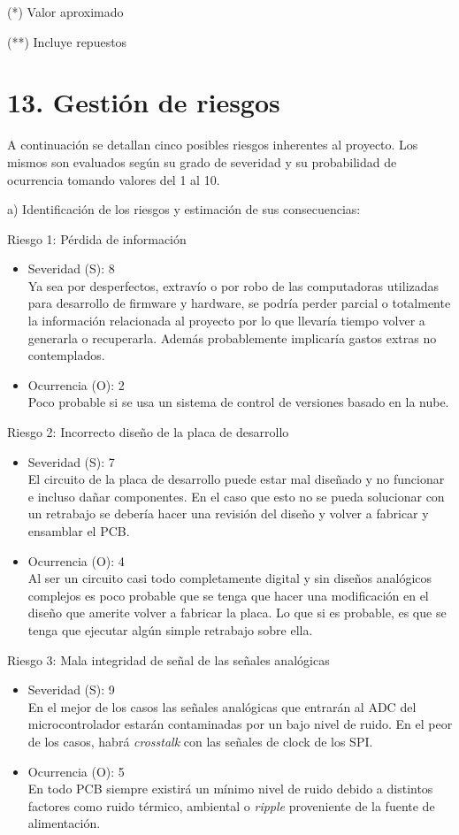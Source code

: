 \documentclass[
11pt, %
]{charter}
\begin{document}
(*) Valor aproximado

(**) Incluye repuestos

\section{13. Gestión de riesgos}
\label{sec:riesgos}

A continuación se detallan cinco posibles riesgos inherentes al proyecto. Los mismos son
evaluados según su grado de severidad y su probabilidad de ocurrencia tomando valores del
1 al 10.

a) Identificación de los riesgos y estimación de sus consecuencias:

Riesgo 1: Pérdida de información
\begin{itemize}
	\item Severidad (S): 8 \\
	Ya sea por desperfectos, extravío o por robo de las computadoras utilizadas para desarrollo de firmware y hardware, se podría perder parcial o totalmente la información relacionada al proyecto por lo que llevaría tiempo volver a generarla o recuperarla. Además probablemente implicaría gastos extras no contemplados.
	\item Ocurrencia (O): 2 \\
	Poco probable si se usa un sistema de control de versiones basado en la nube.
\end{itemize}

Riesgo 2: Incorrecto diseño de la placa de desarrollo
\begin{itemize}
	\item Severidad (S): 7 \\
	El circuito de la placa de desarrollo puede estar mal diseñado y no funcionar e incluso dañar componentes. En el caso que esto no se pueda solucionar con un retrabajo se debería hacer una revisión del diseño y volver a fabricar y ensamblar el PCB.
	\item Ocurrencia (O): 4 \\
	Al ser un circuito casi todo completamente digital y sin diseños analógicos complejos es poco probable que se tenga que hacer una modificación en el diseño que amerite volver a fabricar la placa. Lo que si es probable, es que se tenga que ejecutar algún simple retrabajo sobre ella.
\end{itemize}

Riesgo 3: Mala integridad de señal de las señales analógicas
\begin{itemize}
	\item Severidad (S): 9 \\
	En el mejor de los casos las señales analógicas que entrarán al ADC del microcontrolador estarán contaminadas por un bajo nivel de ruido. En el peor de los casos, habrá \textit{crosstalk} con las señales de clock de los SPI.
	\item Ocurrencia (O): 5 \\
	En todo PCB siempre existirá un mínimo nivel de ruido debido a distintos factores como ruido térmico, ambiental o \textit{ripple} proveniente de la fuente de alimentación.
\end{itemize}
\end{document}
